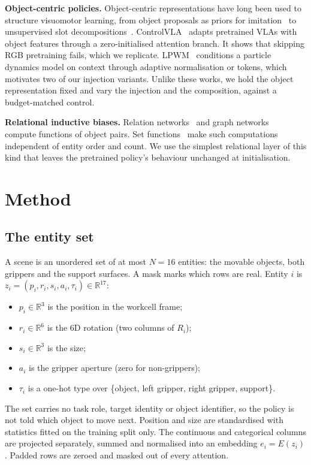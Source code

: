 \documentclass[letterpaper, 10pt, journal, twoside]{IEEEtran}
\begin{document}
\textbf{Object-centric policies.}
Object-centric representations have long been used to structure visuomotor
learning, from object proposals as priors for imitation~\cite{zhu2022viola}
to unsupervised slot decompositions~\cite{locatello2020slot}.
ControlVLA~\cite{li2025controlvla} adapts pretrained VLAs with object
features through a zero-initialised attention branch. It shows that skipping
RGB pretraining fails, which we replicate. LPWM~\cite{lpwm} conditions a
particle dynamics model on context through adaptive normalisation or tokens,
which motivates two of our injection variants. Unlike these works, we hold
the object representation fixed and vary the injection and the composition,
against a budget-matched control.

\textbf{Relational inductive biases.}
Relation networks~\cite{santoro2017rn} and graph
networks~\cite{battaglia2018relational} compute functions of object pairs.
Set functions~\cite{zaheer2017deepsets} make such computations independent
of entity order and count. We use the simplest relational layer of this kind
that leaves the pretrained policy's behaviour unchanged at initialisation.

\section{Method}
\label{sec:method}

\subsection{The entity set}
\label{sec:entities}
A scene is an unordered set of at most $N{=}16$ entities: the movable
objects, both grippers and the support surfaces. A mask marks which rows are
real. Entity $i$ is
$z_i = (p_i, r_i, s_i, a_i, \tau_i) \in \mathbb{R}^{17}$:
\begin{itemize}
  \item $p_i\in\mathbb{R}^3$ is the position in the workcell frame;
  \item $r_i\in\mathbb{R}^6$ is the 6D rotation (two columns of $R_i$);
  \item $s_i\in\mathbb{R}^3$ is the size;
  \item $a_i$ is the gripper aperture (zero for non-grippers);
  \item $\tau_i$ is a one-hot type over \{object, left gripper, right
    gripper, support\}.
\end{itemize}
The set carries no task role, target identity or object identifier, so the
policy is not told which object to move next. Position and size are
standardised with statistics fitted on the training split only. The
continuous and categorical columns are projected separately, summed and
normalised into an embedding $e_i = E(z_i)$. Padded rows are zeroed and
masked out of every attention.
\end{document}

